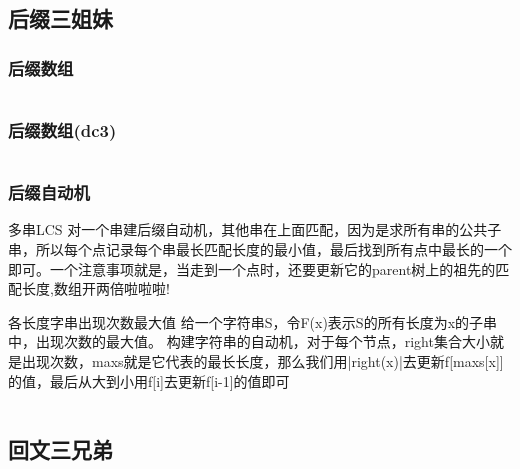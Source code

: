 \documentclass[landscape, twoside, a4paper]{article}
\newcommand{\cppcode}[1]{
	\inputminted[mathescape,
	frame=lines,linenos]{cpp}{source/#1}
}
\begin{document}
\begin{multicols}{2}
\begin{spacing}{0.8}
\cppcode{string-manipulation/ACmachine.cpp}


\subsection{后缀三姐妹}


\subsubsection{后缀数组}


\cppcode{string-manipulation/Sa.cpp}


\subsubsection{后缀数组(dc3)}

\cppcode{string-manipulation/DC3.cpp}


\subsubsection{后缀自动机}
\indent 多串LCS
\indent 对一个串建后缀自动机，其他串在上面匹配，因为是求所有串的公共子串，所以每个点记录每个串最长匹配长度的最小值，最后找到所有点中最长的一个即可。一个注意事项就是，当走到一个点时，还要更新它的parent树上的祖先的匹配长度,数组开两倍啦啦啦!


\indent 各长度字串出现次数最大值
\indent 给一个字符串S，令F(x)表示S的所有长度为x的子串中，出现次数的最大值。
\indent 构建字符串的自动机，对于每个节点，right集合大小就是出现次数，maxs就是它代表的最长长度，那么我们用|right(x)|去更新f[maxs[x]]的值，最后从大到小用f[i]去更新f[i-1]的值即可

\cppcode{string-manipulation/Sam-LCS.cpp}






\subsection{回文三兄弟}


\end{spacing}
\end{multicols}
\end{document}

